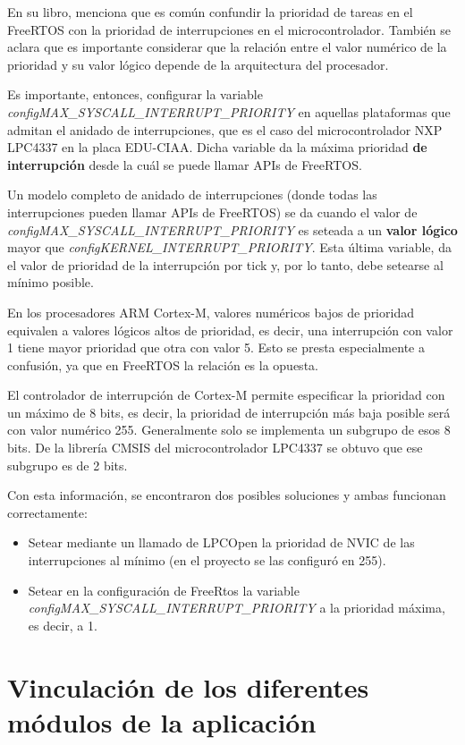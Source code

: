 \documentclass{IEEEtran}
\begin{document}
En su libro, \textcite{FreeRTOS} menciona que es común confundir la prioridad de tareas en el FreeRTOS con la prioridad de interrupciones en el microcontrolador. También se aclara que es importante considerar que la relación entre el valor numérico de la prioridad y su valor lógico depende de la arquitectura del procesador.

Es importante, entonces, configurar la variable \textit{configMAX\_SYSCALL\_INTERRUPT\_PRIORITY} en aquellas plataformas que admitan el anidado de interrupciones, que es el caso del microcontrolador NXP LPC4337 en la placa EDU-CIAA. Dicha variable da la máxima prioridad \textbf{de interrupción} desde la cuál se puede llamar APIs de FreeRTOS.

Un modelo completo de anidado de interrupciones (donde todas las interrupciones pueden llamar APIs de FreeRTOS) se da cuando el valor de \textit{configMAX\_SYSCALL\_INTERRUPT\_PRIORITY} es seteada a un \textbf{valor lógico} mayor que \textit{configKERNEL\_INTERRUPT\_PRIORITY}. Esta última variable, da el valor de prioridad de la interrupción por tick y, por lo tanto, debe setearse al mínimo posible.

En los procesadores ARM Cortex-M, valores numéricos bajos de prioridad equivalen a valores lógicos altos de prioridad, es decir, una interrupción con valor 1 tiene mayor prioridad que otra con valor 5. Esto se presta especialmente a confusión, ya que en FreeRTOS la relación es la opuesta.

El controlador de interrupción de Cortex-M permite especificar la prioridad con un máximo de 8 bits, es decir, la prioridad de interrupción más baja posible será con valor numérico 255. Generalmente solo se implementa un subgrupo de esos 8 bits. De la librería CMSIS del microcontrolador LPC4337 se obtuvo que ese subgrupo es de 2 bits.

Con esta información, se encontraron dos posibles soluciones y ambas funcionan correctamente:

\begin{itemize}
    \item Setear mediante un llamado de LPCOpen la prioridad de NVIC de las interrupciones al mínimo (en el proyecto se las configuró en 255).
    \item Setear en la configuración de FreeRtos la variable \textit{configMAX\_SYSCALL\_INTERRUPT\_PRIORITY} a la prioridad máxima, es decir, a 1.
\end{itemize}

\section{Vinculación de los diferentes módulos de la aplicación}
\label{sec:vinculacion}
\end{document}

